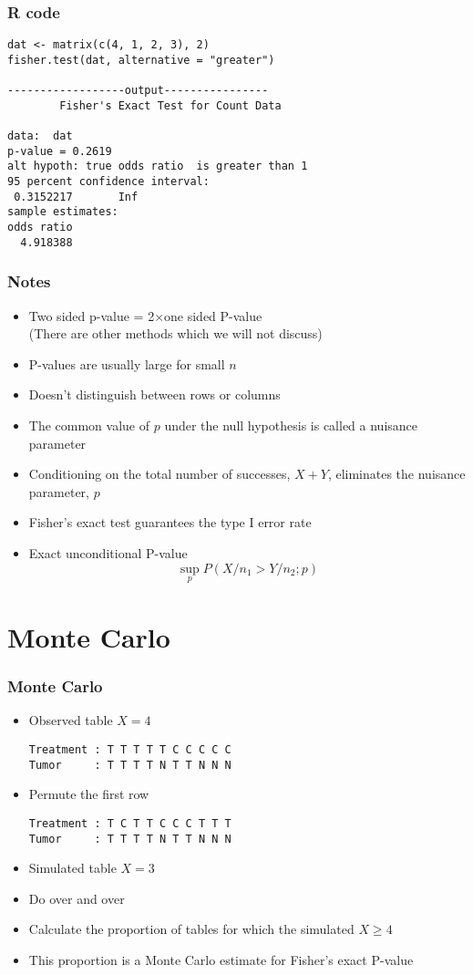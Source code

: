 \documentclass[aspectratio=169]{beamer}
\begin{document}
\begin{frame}[fragile]\frametitle{R code}
\begin{verbatim}
dat <- matrix(c(4, 1, 2, 3), 2)
fisher.test(dat, alternative = "greater")

------------------output----------------
        Fisher's Exact Test for Count Data

data:  dat 
p-value = 0.2619
alt hypoth: true odds ratio  is greater than 1 
95 percent confidence interval:
 0.3152217       Inf 
sample estimates:
odds ratio 
  4.918388 
\end{verbatim}
\end{frame}

\begin{frame}\frametitle{Notes}
\begin{itemize}
\item Two sided p-value = 2$\times$one sided P-value \\
  (There are other methods which we will not discuss)
\item P-values are usually large for small $n$ 
\item Doesn't distinguish between rows or columns 
\item The common value of $p$ under the null hypothesis
  is called a nuisance parameter
\item Conditioning on the total number of successes, $X + Y$, eliminates
  the nuisance parameter, $p$
\item Fisher's exact test guarantees the type I error rate
\item Exact unconditional P-value
$$
\sup_p P(X/n_1 > Y/n_2; p)
$$
\end{itemize}
\end{frame}

\section{Monte Carlo}
\begin{frame}[fragile]\frametitle{Monte Carlo}
\begin{itemize}
\item Observed table $X = 4$
\begin{verbatim} 
Treatment : T T T T T C C C C C         
Tumor     : T T T T N T T N N N 
\end{verbatim}
\item Permute the first row
\begin{verbatim}
Treatment : T C T T C C C T T T     
Tumor     : T T T T N T T N N N
\end{verbatim}
\item Simulated table $X = 3$ 
\item Do over and over 
\item Calculate the proportion of tables for 
which the simulated $X \geq 4$ 
\item This proportion is a Monte Carlo estimate
for Fisher's exact P-value
\end{itemize}
\end{frame}
\end{document}
